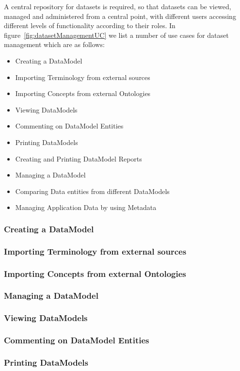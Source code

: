 \documentclass{article}
\begin{document}
A central repository for datasets is required, so that datasets can be viewed, managed and administered from a central point, with different users accessing different levels of functionality according to their roles. In figure~\ref{fig:datasetManagementUC} we list a number of use cases for dataset management which are as follows:
\begin{itemize}
	\item Creating a DataModel
	\item Importing Terminology from external sources
	\item Importing Concepts from external Ontologies
	\item Viewing DataModels
	\item Commenting on DataModel Entities
	\item Printing DataModels
	\item Creating and Printing DataModel Reports
	\item Managing a DataModel
	\item Comparing Data entities from different DataModels
	\item Managing Application Data by using Metadata
\end{itemize}

\subsubsection{Creating a DataModel}
\subsubsection{Importing Terminology from external sources}
\subsubsection{Importing Concepts from external Ontologies}
\subsubsection{Managing a DataModel}
\subsubsection{Viewing DataModels}
\subsubsection{Commenting on DataModel Entities}
\subsubsection{Printing DataModels}
\end{document}
